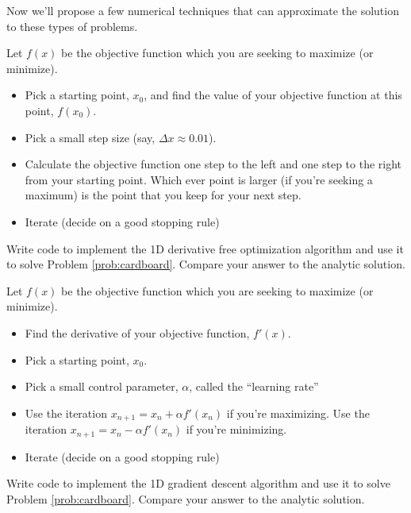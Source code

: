 
Now we'll propose a few numerical techniques that can approximate the solution to these
types of problems.
\begin{algorithm}
    Let $f(x)$ be the objective function which you are seeking to maximize (or minimize).
    \begin{itemize}
        \item Pick a starting point, $x_0$, and find the value of your
            objective function at this point, $f(x_0)$.
        \item Pick a small step size (say, $\Delta x \approx 0.01$).
        \item Calculate the objective function one step to the left and
            one step to the right from your starting point.  Which ever
            point is larger (if you're seeking a maximum) is the point
            that you keep for your next step.
        \item Iterate (decide on a good stopping rule)
    \end{itemize}
\end{algorithm}
\begin{problem}
    Write code to implement the 1D derivative free optimization algorithm and use it to solve
    Problem \ref{prob:cardboard}.  Compare your answer to the analytic solution.
\end{problem}

\begin{algorithm}
    Let $f(x)$ be the objective function which you are seeking to maximize (or minimize).
    \begin{itemize}
        \item Find the derivative of your objective function, $f'(x)$.
        \item Pick a starting point, $x_0$.
        \item Pick a small control parameter, $\alpha$, called the ``learning rate''
        \item Use the iteration $x_{n+1} = x_n + \alpha f'(x_n) $ if you're maximizing.
            Use the iteration $x_{n+1} = x_n - \alpha f'(x_n)$ if you're minimizing.
        \item Iterate (decide on a good stopping rule)
    \end{itemize}
\end{algorithm}
\begin{problem}
    Write code to implement the 1D gradient descent algorithm and use it to solve
    Problem \ref{prob:cardboard}. Compare your answer to the analytic solution.
\end{problem}

